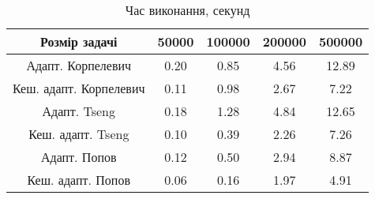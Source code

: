 \begin{table}[H]
	\centering
	\begin{tabular}{|c||c|c|c|c|}\hline
		Розмір задачі & 50000 & 100000 & 200000 & 500000 \\ \hline \hline
		Адапт. Корпелевич & 0.20 & 0.85 & 4.56 & 12.89 \\ \hline
		Кеш. адапт. Корпелевич & 0.11 & 0.98 & 2.67 & 7.22 \\ \hline
		Адапт. Tseng & 0.18 & 1.28 & 4.84 & 12.65 \\ \hline
		Кеш. адапт. Tseng & 0.10 & 0.39 & 2.26 & 7.26 \\ \hline
		Адапт. Попов & 0.12 & 0.50 & 2.94 & 8.87 \\ \hline
		Кеш. адапт. Попов & 0.06 & 0.16 & 1.97 & 4.91 \\ \hline
	\end{tabular}
	\caption{Час виконання, секунд}
\end{table}
